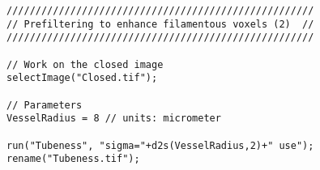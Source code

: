 \begin{lstlisting}
/////////////////////////////////////////////////////
// Prefiltering to enhance filamentous voxels (2)  //
/////////////////////////////////////////////////////

// Work on the closed image
selectImage("Closed.tif");

// Parameters
VesselRadius = 8 // units: micrometer

run("Tubeness", "sigma="+d2s(VesselRadius,2)+" use");
rename("Tubeness.tif");


\end{lstlisting}